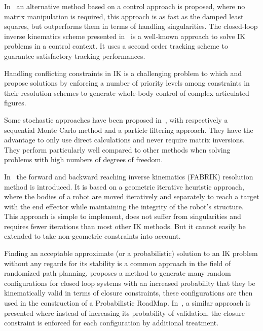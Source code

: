 In~\cite{pechev2008inverse} an alternative method based on a control approach is proposed, where no matrix manipulation is required, this approach is as fast as the damped least squares, but outperforms them in terms of handling singularities.
The closed-loop inverse kinematics scheme presented in~\cite{siciliano1990closed} is a well-known approach to solve IK problems in a control context.
It uses a second order tracking scheme to guarantee satisfactory tracking performances.

Handling conflicting constraints in IK is a challenging problem to which \cite{baerlocher2004inverse} and \cite{sentis2005synthesis} propose solutions by enforcing a number of priority levels among constraints in their resolution schemes to generate whole-body control of complex articulated figures.

Some stochastic approaches have been proposed in~\cite{courty2008inverse, hecker2008real}, with respectively a sequential Monte Carlo method and a particle filtering approach.
They have the advantage to only use direct calculations and never require matrix inversions.
They perform particularly well compared to other methods when solving problems with high numbers of degrees of freedom.

In~\cite{AristidouFABRIK, Aristidou:2016_ExtFABRIK} the forward and backward reaching inverse kinematics (FABRIK) resolution method is introduced.
It is based on a geometric iterative heuristic approach, where the bodies of a robot are moved iteratively and separately to reach a target with the end effector while maintaining the integrity of the robot's structure.
This approach is simple to implement, does not suffer from singularities and requires fewer iterations than most other IK methods.
But it cannot easily be extended to take non-geometric constraints into account.

Finding an acceptable approximate (or a probabilistic) solution to an IK problem without any regards for its stability is a common approach in the field of randomized path planning.
\cite{cortes2002random} proposes a method to generate many random configurations for closed loop systems with an increased probability that they be kinematically valid in terms of closure constraints, these configurations are then used in the construction of a Probabilistic RoadMap. In~\cite{lavalle1999probabilistic}, a similar approach is presented where instead of increasing its probability of validation, the closure constraint is enforced for each configuration by additional treatment.

